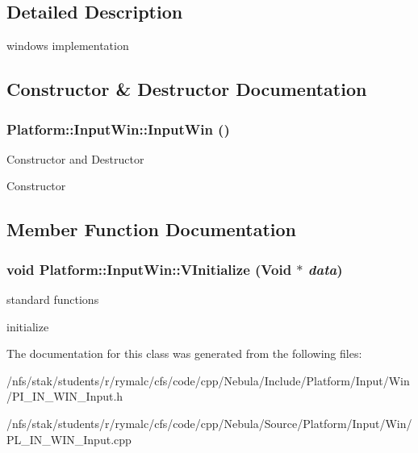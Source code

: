 \subsection{Detailed Description}
windows implementation 

\subsection{Constructor \& Destructor Documentation}
\hypertarget{classPlatform_1_1InputWin_a18720756c7fd9150c87c5e0f074de6ac}{
\subsubsection[{InputWin}]{\setlength{\rightskip}{0pt plus 5cm}Platform::InputWin::InputWin ()}}
\label{classPlatform_1_1InputWin_a18720756c7fd9150c87c5e0f074de6ac}
Constructor and Destructor

Constructor 

\subsection{Member Function Documentation}
\hypertarget{classPlatform_1_1InputWin_a37abaf8a29a636f6cc3824ec215a993d}{
\subsubsection[{VInitialize}]{\setlength{\rightskip}{0pt plus 5cm}void Platform::InputWin::VInitialize ({\bf Void} $\ast$ {\em data})}}
\label{classPlatform_1_1InputWin_a37abaf8a29a636f6cc3824ec215a993d}
standard functions

initialize 

The documentation for this class was generated from the following files:\begin{DoxyCompactItemize}
\item 
/nfs/stak/students/r/rymalc/cfs/code/cpp/Nebula/Include/Platform/Input/Win/PI\_\-IN\_\-WIN\_\-Input.h\item 
/nfs/stak/students/r/rymalc/cfs/code/cpp/Nebula/Source/Platform/Input/Win/PL\_\-IN\_\-WIN\_\-Input.cpp\end{DoxyCompactItemize}
